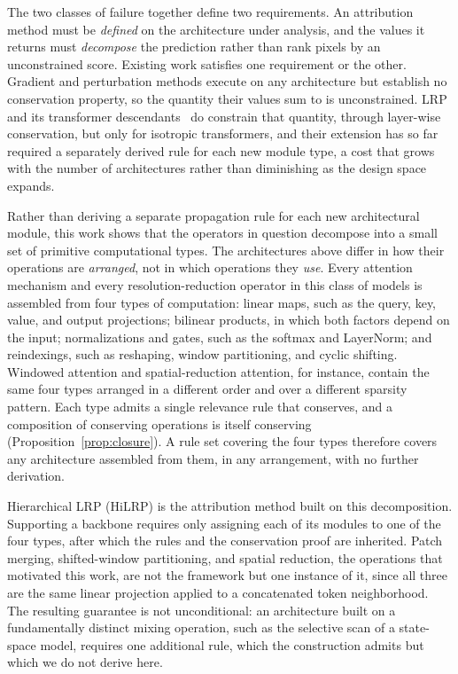 \documentclass[lettersize,journal]{IEEEtran}
\theoremstyle{definition}
\theoremstyle{plain}
\begin{document}
The two classes of failure together define two requirements. An attribution
method must be \emph{defined} on the architecture under analysis, and the values
it returns must \emph{decompose} the prediction rather than rank pixels by an
unconstrained score. Existing work satisfies one requirement or the other.
Gradient and perturbation methods execute on any architecture but establish no
conservation property, so the quantity their values sum to is unconstrained.
LRP~\cite{bach2015lrp} and its transformer
descendants~\cite{chefer2021transformer,achtibat2024attnlrp} do constrain that
quantity, through layer-wise conservation, but only for isotropic transformers,
and their extension has so far required a separately derived rule for each new
module type, a cost that grows with the number of architectures rather than
diminishing as the design space expands.

Rather than deriving a separate propagation rule for each new architectural
module, this work shows that the operators in question decompose into a small
set of primitive computational types. The architectures above differ in how
their operations are \emph{arranged}, not in which operations they \emph{use}.
Every attention
mechanism and every resolution-reduction operator in this class of models is
assembled from four types of computation: linear maps, such as the query, key,
value, and output projections; bilinear products, in which both factors depend
on the input; normalizations and gates, such as the softmax and LayerNorm; and
reindexings, such as reshaping, window partitioning, and cyclic shifting.
Windowed attention and spatial-reduction attention, for instance, contain the
same four types arranged in a different order and over a different sparsity
pattern. Each type admits a single relevance rule that conserves, and a
composition of conserving operations is itself conserving
(Proposition~\ref{prop:closure}). A rule set covering the four types therefore
covers any architecture assembled from them, in any arrangement, with no further
derivation.

Hierarchical LRP (HiLRP) is the attribution method built on this decomposition.
Supporting a backbone requires only assigning each of its modules to one of the
four types, after which the rules and the conservation proof are inherited.
Patch merging, shifted-window partitioning, and spatial reduction, the
operations that motivated this work, are not the framework but one instance of
it, since all three are the same linear projection applied to a concatenated
token neighborhood. The resulting guarantee is not unconditional: an
architecture built on a fundamentally distinct mixing operation, such as the selective
scan of a state-space model, requires one additional rule, which the
construction admits but which we do not derive here.
\end{document}
